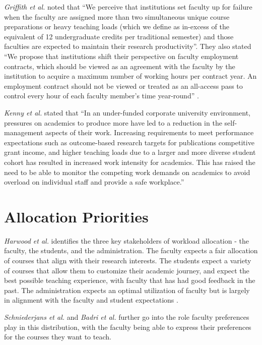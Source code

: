 \textit{Griffith et al.} noted that ``We perceive that institutions set faculty up for failure when the faculty are assigned more than two simultaneous unique course preparations or heavy teaching loads (which we define as in-excess of the equivalent of 12 undergraduate credits per traditional semester) and those faculties are expected to maintain their research productivity''. They also stated ``We propose that institutions shift their perspective on faculty employment contracts, which should be viewed as an agreement with the faculty by the institution to acquire a maximum number of working hours per contract year. An employment contract should not be viewed or treated as an all-access pass to control every hour of each faculty member's time year-round'' \cite{griffith2020framework}.

\textit{Kenny et al.} stated that ``In an under-funded corporate university environment, pressures on academics to produce more have led to a reduction in the self-management aspects of their work. Increasing requirements to meet performance expectations such as outcome-based research targets for publications competitive grant income, and higher teaching loads due to a larger and more diverse student cohort has resulted in increased work intensity for academics. This has raised the need to be able to monitor the competing work demands on academics to avoid overload on individual staff and provide a safe workplace.'' \cite{kenny2014effectiveness}

\section{Allocation Priorities}

\textit{Harwood et al.} identifies the three key stakeholders of workload allocation - the faculty, the students, and the administration. The faculty expects a fair allocation of courses that align with their research interests. The students expect a variety of courses that allow them to customize their academic journey, and expect the best possible teaching experience, with faculty that has had good feedback in the past. The administration expects an optimal utilization of faculty but is largely in alignment with the faculty and student expectations \cite{harwood1975optimizing}.

\textit{Schniederjans et al.} and \textit{Badri et al.} \cite{schniederjans1987goal, badri1998multi} further go into the role faculty preferences play in this distribution, with the faculty being able to express their preferences for the courses they want to teach.

